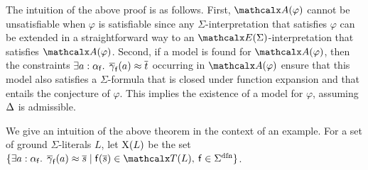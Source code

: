 \begin{longv}
The intuition of the above proof is as follows.
First, $\conv( \varphi )$ cannot be unsatisfiable when $\varphi$ is satisfiable
since any $\Sigma$-interpretation that satisfies $\varphi$ can be extended in a straightforward way to 
an $\extendsig{\Sigma}$-interpretation that satisfies $\conv( \varphi )$.
Second, if a model is found for $\conv( \varphi )$,
then the constraints $\exists a : \alpha_{\mathsf{f}}.\;\, \overline{\gamma}_{\mathsf{f}}( a ) \approx \overline{t}$
occurring in $\conv( \varphi )$ ensure that this model also satisfies
a $\Sigma$-formula that is closed under function expansion and
that entails the conjecture of $\varphi$.
This implies the existence of a model for $\varphi$,
assuming $\DDD$ is admissible.
\end{longv}

\begin{shortv}
We give an intuition of the above theorem in the context of an example.
For a set of ground $\Sigma$-literals $L$, let $\mathrm{X}( L )$ be the set
$\{ \exists a : {\fargtype{\con{f}}}.\;\, \vecfarg{\con{f}}( a ) \teq \vec s
\mid \con{f}( \vec s ) \in \terms( L ),\: \con{f} \in \sfundefs{\Sigma}
\}$.
\end{shortv}

